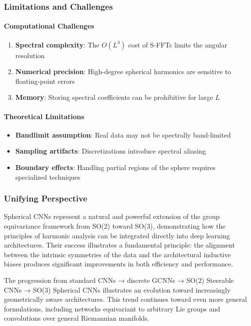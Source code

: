 \subsubsection{Limitations and Challenges}

\paragraph{Computational Challenges}

\begin{enumerate}
    \item \textbf{Spectral complexity}: The $O(L^3)$ cost of S-FFTs limits the angular resolution
    \item \textbf{Numerical precision}: High-degree spherical harmonics are sensitive to floating-point errors
    \item \textbf{Memory}: Storing spectral coefficients can be prohibitive for large $L$
\end{enumerate}

\paragraph{Theoretical Limitations}

\begin{itemize}
    \item \textbf{Bandlimit assumption}: Real data may not be spectrally band-limited
    \item \textbf{Sampling artifacts}: Discretizations introduce spectral aliasing
    \item \textbf{Boundary effects}: Handling partial regions of the sphere requires specialized techniques
\end{itemize}

\subsubsection{Unifying Perspective}

Spherical CNNs represent a natural and powerful extension of the group equivariance framework from SO(2) toward SO(3), demonstrating how the principles of harmonic analysis can be integrated directly into deep learning architectures. Their success illustrates a fundamental principle: the alignment between the intrinsic symmetries of the data and the architectural inductive biases produces significant improvements in both efficiency and performance.

The progression from standard \glspl{CNN} → discrete \glspl{GCNN} → SO(2) Steerable \glspl{CNN} → SO(3) Spherical \glspl{CNN} illustrates an evolution toward increasingly geometrically aware architectures. This trend continues toward even more general formulations, including networks equivariant to arbitrary Lie groups and convolutions over general Riemannian manifolds.

